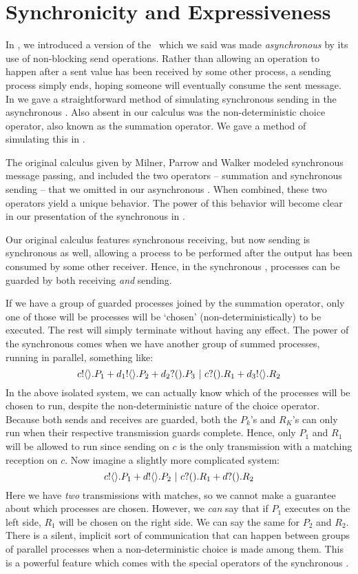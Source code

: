 \chapter{Synchronicity and Expressiveness}
In , we introduced a version of the \picalc\ which we said was made \emph{asynchronous} by its use of non-blocking send operations.  Rather than allowing an operation to happen after a sent value has been received by some other process, a sending process simply ends, hoping someone will eventually consume the sent message.  In  we gave a straightforward method of simulating synchronous sending in the asynchronous \picalc.  Also absent in our calculus was the non-deterministic choice operator, also known as the summation operator.  We gave a method of simulating this in .

The original calculus given by Milner, Parrow and Walker modeled synchronous message passing, and included the two operators -- summation and synchronous sending -- that we omitted in our asynchronous \picalc.  When combined, these two operators yield a unique behavior.  The power of this behavior will become clear in our presentation of the synchronous \picalc in .

Our original calculus features synchronous receiving, but now sending is synchronous as well, allowing a process to be performed after the output has been consumed by some other receiver.  Hence, in the synchronous \picalc, processes can be guarded by both receiving \emph{and} sending.  

If we have a group of guarded processes joined by the summation operator, only one of those will be processes will be `chosen' (non-deterministically) to be executed.  The rest will simply terminate without having any effect.  The power of the synchronous \picalc comes when we have another group of summed processes, running in parallel, something like: 
\[
	{c}!\langle{}\rangle.P_1 + {d_1}!\langle{}\rangle.P_2 + {d_2}?({}).P_3 \ |\  {c}?({}).R_1 + {d_3}!\langle{}\rangle.R_2
\]
In the above isolated system, we can actually know which of the processes will be chosen to run, despite the non-deterministic nature of the choice operator.  Because both sends and receives are guarded, both the $P_k$'s and $R_K$'s can only run when their respective transmission guards complete.  Hence, only $P_1$ and $R_1$ will be allowed to run since sending on $c$ is the only transmission with a matching reception on $c$.  Now imagine a slightly more complicated system:
\[
	{c}!\langle{}\rangle.P_1 + {d}!\langle{}\rangle.P_2 \ |\  {c}?({}).R_1 + {d}?({}).R_2
\]
Here we have \emph{two} transmissions with matches, so we cannot make a guarantee about which processes are chosen.  However, we \emph{can} say that if $P_1$ executes on the left side, $R_1$ will be chosen on the right side.  We can say the same for $P_2$ and $R_2$.  There is a silent, implicit sort of communication that can happen between groups of parallel processes when a non-deterministic choice is made among them.  This is a powerful feature which comes with the special operators of the synchronous \picalc.

